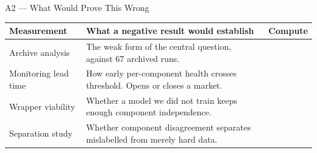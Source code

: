 \begin{frame}{A2 --- What Would Prove This Wrong}

{\fontsize{6.4}{7.9}\selectfont
\begin{center}
\begin{tabular}{L{4.0cm} L{5.4cm} C{2.0cm}}
\toprule
\color{oxgray}\textbf{Measurement} & \color{oxgray}\textbf{What a negative result would establish} & \color{oxgray}\textbf{Compute} \\
\midrule
Archive analysis        & The weak form of the central question, against 67 archived runs. &  \\
Monitoring lead time    & How early per-component health crosses threshold. Opens or closes a market. &  \\
Wrapper viability       & Whether a model we did not train keeps enough component independence. &  \\
Separation study        & Whether component disagreement separates mislabelled from merely hard data. &  \\
\bottomrule
\end{tabular}
\end{center}
}

\end{frame}

